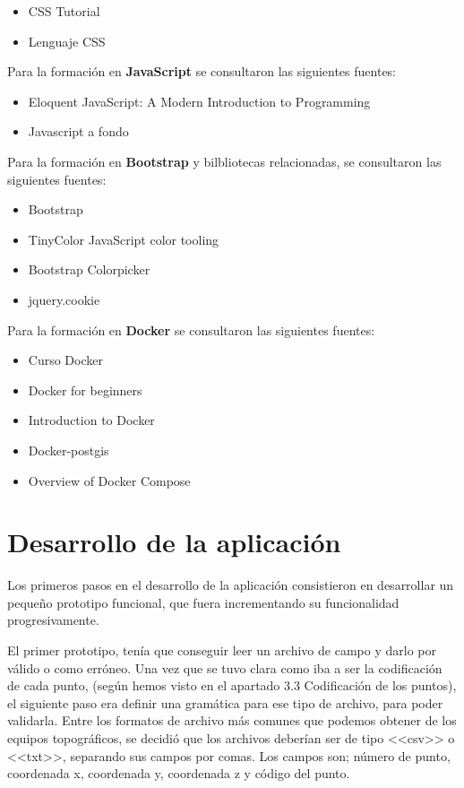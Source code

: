 \begin{itemize}
\item CSS Tutorial \cite{css3}
\item Lenguaje CSS \cite{css3_1}
\end{itemize}

Para la formación en \textbf{JavaScript} se consultaron las siguientes fuentes:

\begin{itemize}
\item Eloquent JavaScript: A Modern Introduction to Programming \cite{JavaScript}
\item Javascript a fondo \cite{JavaScript_1}
\end{itemize}

Para la formación en \textbf{Bootstrap} y bilbliotecas relacionadas, se consultaron las siguientes fuentes:

\begin{itemize}
\item Bootstrap \cite{Bootstrap}
\item TinyColor JavaScript color tooling \cite{TinyColor}
\item Bootstrap Colorpicker \cite{Colorpicker}
\item jquery.cookie \cite{j-cookie}
\end{itemize}


Para la formación en \textbf{Docker} se consultaron las siguientes fuentes:

\begin{itemize}
\item Curso Docker \cite{Docker}
\item Docker for beginners \cite{Docker_1}
\item Introduction to Docker \cite{Docker_2}
\item Docker-postgis \cite{Docker_3}
\item Overview of Docker Compose \cite{Docker_4}
\end{itemize}

\section{Desarrollo de la aplicación}

Los primeros pasos en el desarrollo de la aplicación consistieron en desarrollar un pequeño prototipo funcional, que fuera incrementando su funcionalidad progresivamente.

El primer prototipo, tenía que conseguir leer un archivo de campo y darlo por válido o como erróneo. Una vez que se tuvo clara como iba a ser la codificación de cada punto, (según hemos visto en el apartado 3.3 Codificación de los puntos), el siguiente paso era definir una gramática para ese tipo de archivo, para poder validarla. Entre los formatos de archivo más comunes que podemos obtener de los equipos topográficos, se decidió que los archivos deberían ser de tipo <<csv>> o <<txt>>, separando sus campos por comas. Los campos son; número de punto, coordenada x, coordenada y, coordenada z y código del punto. 

